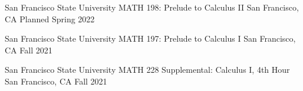 \documentclass[../omelveny-cv]{subfiles}
\begin{document}


\begin{cventries}
    \cventry
    {San Francisco State University} %
    {MATH 198: Prelude to Calculus II} %
    {San Francisco, CA} %
    {Planned Spring 2022} %
    {}

    \vspace{-0.75em}

    \cventry
    {San Francisco State University} %
    {MATH 197: Prelude to Calculus I} %
    {San Francisco, CA} %
    {Fall 2021} %
    {}

    \vspace{-0.75em}

    \cventry
    {San Francisco State University} %
    {MATH 228 Supplemental: Calculus I, 4th Hour} %
    {San Francisco, CA} %
    {Fall 2021} %
    {}

\end{cventries}
\end{document}
